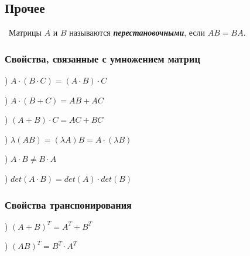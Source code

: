 \subsection*{Прочее}

\noindent \textasteriskcentered~Матрицы $A$ и $B$ называются \textbf{\textit{перестановочными}}, если $A B = B A$.


\subsubsection*{Свойства, связанные с умножением матриц}

) $A \cdot (B \cdot C) = (A \cdot B) \cdot C$

\smallskip
{}) $A \cdot (B + C) = A B + A C$

\smallskip
{}) $(A + B) \cdot C = A C + B C$

\smallskip
{}) $\lambda (A B) = (\lambda A) B = A \cdot (\lambda B)$

\smallskip
{}) $A \cdot B \neq B \cdot A$

\smallskip
{}) $det (A \cdot B) = det(A) \cdot det(B)$


\subsubsection*{Свойства транспонирования}

) $(A + B)^T = A^T + B^T$

\smallskip
{}) $(AB)^T = B^T \cdot A^T$
